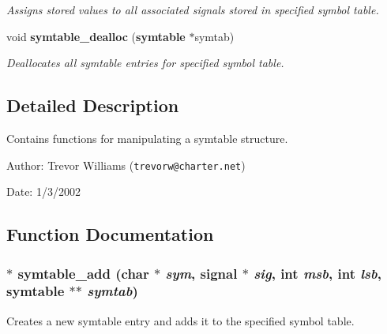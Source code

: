 \begin{CompactItemize}
\begin{CompactList}\small\item\em Assigns stored values to all associated signals stored in specified symbol table. \item\end{CompactList}\item 
void {\bf symtable\_\-dealloc} ({\bf symtable} $\ast$symtab)
\begin{CompactList}\small\item\em Deallocates all symtable entries for specified symbol table. \item\end{CompactList}\end{CompactItemize}


\subsection{Detailed Description}
Contains functions for manipulating a symtable structure. 

\begin{Desc}
\item[Author:]Trevor Williams ({\tt trevorw@charter.net}) \end{Desc}
\begin{Desc}
\item[Date:]1/3/2002 \end{Desc}


\subsection{Function Documentation}
\subsubsection{$\ast$ symtable\_\-add (char $\ast$ {\em sym}, {\bf signal} $\ast$ {\em sig}, int {\em msb}, int {\em lsb}, {\bf symtable} $\ast$$\ast$ {\em symtab})}\label{symtable_8h_a0}


Creates a new symtable entry and adds it to the specified symbol table. 

